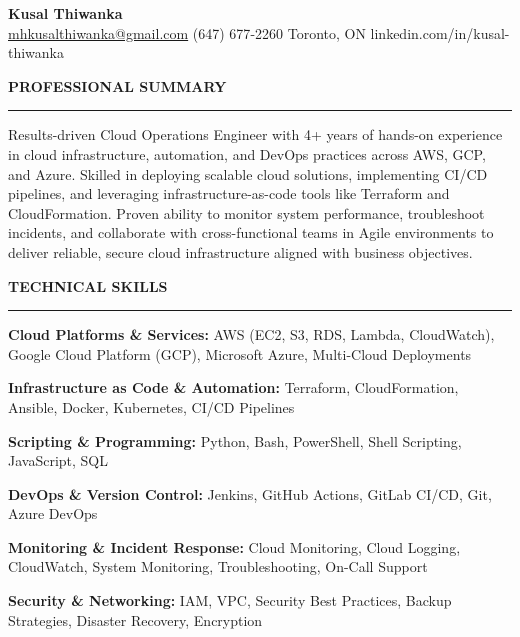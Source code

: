 \documentclass[10pt,letterpaper]{article}
\begin{document}
\begin{center}
{\LARGE\textbf{Kusal Thiwanka}}\\[3pt]
\href{mailto:mhkusalthiwanka@gmail.com}{mhkusalthiwanka@gmail.com}\hspace{2em}%
(647) 677{-}2260\hspace{2em}%
Toronto, ON\hspace{2em}
linkedin.com/in/kusal-thiwanka
\end{center}

\vspace{6pt}

\textbf{PROFESSIONAL SUMMARY}\\[-8pt]
\noindent\rule{\textwidth}{1pt}

\vspace{-2pt}

Results-driven Cloud Operations Engineer with 4+ years of hands-on experience in cloud infrastructure, automation, and DevOps practices across AWS, GCP, and Azure. Skilled in deploying scalable cloud solutions, implementing CI/CD pipelines, and leveraging infrastructure-as-code tools like Terraform and CloudFormation. Proven ability to monitor system performance, troubleshoot incidents, and collaborate with cross-functional teams in Agile environments to deliver reliable, secure cloud infrastructure aligned with business objectives.

\vspace{8pt}

\textbf{TECHNICAL SKILLS}\\[-8pt]
\noindent\rule{\textwidth}{1pt}

\vspace{-2pt}

\textbf{Cloud Platforms \& Services:} AWS (EC2, S3, RDS, Lambda, CloudWatch), Google Cloud Platform (GCP), Microsoft Azure, Multi-Cloud Deployments

\textbf{Infrastructure as Code \& Automation:} Terraform, CloudFormation, Ansible, Docker, Kubernetes, CI/CD Pipelines

\textbf{Scripting \& Programming:} Python, Bash, PowerShell, Shell Scripting, JavaScript, SQL

\textbf{DevOps \& Version Control:} Jenkins, GitHub Actions, GitLab CI/CD, Git, Azure DevOps

\textbf{Monitoring \& Incident Response:} Cloud Monitoring, Cloud Logging, CloudWatch, System Monitoring, Troubleshooting, On-Call Support

\textbf{Security \& Networking:} IAM, VPC, Security Best Practices, Backup Strategies, Disaster Recovery, Encryption
\end{document}
